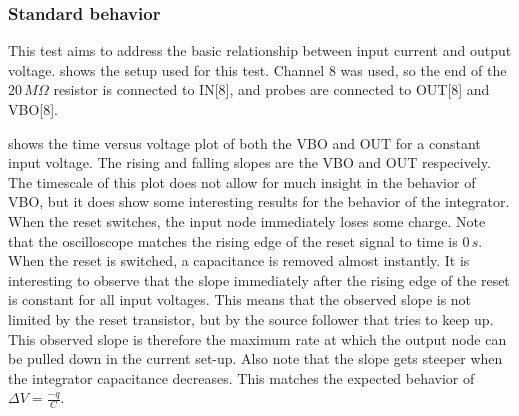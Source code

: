 \subsubsection{Standard behavior}\label{sssec:standard_behavior}
This test aims to address the basic relationship between input current and output voltage.  shows the setup used for this test. Channel 8 was used, so the end of the $20\,M\Omega$ resistor is connected to IN[8], and probes are connected to OUT[8] and VBO[8]. 



 shows the time versus voltage plot of both the VBO and OUT for a constant input voltage. The rising and falling slopes are the VBO and OUT respecively. The timescale of this plot does not allow for much insight in the behavior of VBO, but it does show some interesting results for the behavior of the integrator. When the reset switches, the input node immediately loses some charge. Note that the oscilloscope matches the rising edge of the reset signal to time is $0\,s$. When the reset is switched, a capacitance is removed almost instantly. It is interesting to observe that the slope immediately after the rising edge of the reset is constant for all input voltages. This means that the observed slope is not limited by the reset transistor, but by the source follower that tries to keep up. This observed slope is therefore the maximum rate at which the output node can be pulled down in the current set-up. Also note that the slope gets steeper when the integrator capacitance decreases. This matches the expected behavior of $\Delta V = \frac{-q}{C}$.


